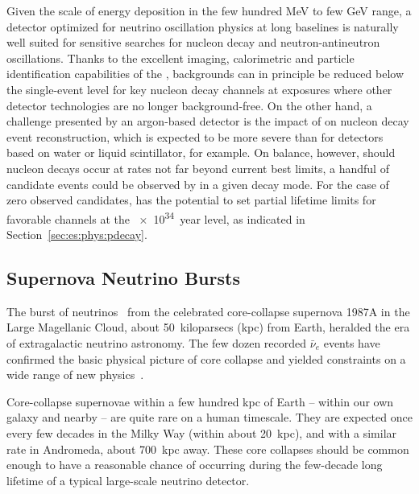 Given the scale of energy deposition in the few hundred \si{\MeV} 
to few \si{\GeV} range, 
a detector optimized for neutrino oscillation physics at long 
baselines is naturally well suited for sensitive searches for 
nucleon decay and neutron-antineutron oscillations.
Thanks to the excellent imaging, calorimetric and particle 
identification capabilities of the , 
backgrounds can in principle be reduced below the single-event 
level for key nucleon decay channels at exposures where other 
detector technologies are no longer background-free.  On the 
other hand, a challenge presented by an argon-based 
detector is the impact of  %
on 
nucleon decay event reconstruction, which is 
expected to be more severe than for detectors based on water 
or liquid scintillator, for example.  
On balance, however, should nucleon decays occur at rates 
not far beyond current best limits, a handful of candidate 
events could be observed by  in a given decay mode.  
%
For the case of zero observed candidates,  has the  
potential to set partial lifetime limits for favorable channels at the 
\SI{e34}{year} level, as indicated in Section~\ref{sec:es:phys:pdecay}.

\subsection{Supernova Neutrino Bursts}

The burst of neutrinos~\cite{Bionta:1987qt,Hirata:1987hu} 
from the celebrated core-collapse supernova 
1987A in the Large Magellanic Cloud, about
\SI{50}{kiloparsecs} (kpc) from Earth, heralded the era of extragalactic neutrino
astronomy.  The few dozen recorded $\bar{\nu}_e$ events
have confirmed the basic physical
picture of core collapse and yielded constraints on a wide range of new
physics~\cite{Schramm:1990pf, Vissani:2014doa}.  

Core-collapse supernovae within a few hundred kpc of Earth --
within our own galaxy and nearby -- are quite rare on a human
timescale.  They are expected once every few decades in the Milky Way
(within about 20~kpc), and with a similar rate in Andromeda, about
700~kpc away.  These core collapses should be common enough to have
a reasonable chance of occurring during the few-decade long lifetime
of a typical large-scale neutrino detector. 

